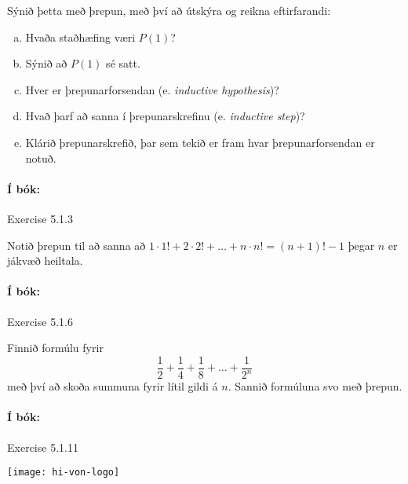 \documentclass{exam}
\begin{document}
\begin{questions}
Sýnið þetta með þrepun, með því að útskýra og reikna eftirfarandi:

\begin{enumerate}[a)]
 \item Hvaða staðhæfing væri $P(1)$?
 \item Sýnið að $P(1)$ sé satt.
 \item Hver er þrepunarforsendan (e. \emph{inductive hypothesis})?
 \item Hvað þarf að sanna í þrepunarskrefinu (e. \emph{inductive step})?
 \item Klárið þrepunarskrefið, þar sem tekið er fram hvar þrepunarforsendan er notuð.
\end{enumerate}

\paragraph{Í bók:} Exercise 5.1.3

\question Notið þrepun til að sanna að $1\cdot 1! + 2\cdot 2! + \ldots + n \cdot n! = (n+1)! - 1$ þegar $n$ er jákvæð heiltala.

\paragraph{Í bók:} Exercise 5.1.6

\question Finnið formúlu fyrir 
\[
 \frac{1}{2} + \frac{1}{4} + \frac{1}{8} + \ldots + \frac{1}{2^n}
\]
með því að skoða summuna fyrir lítil gildi á $n$. Sannið formúluna svo með þrepun.

\paragraph{Í bók:} Exercise 5.1.11

\end{questions}

\vfill
\texttt{[image: hi-von-logo]}
\end{document}
